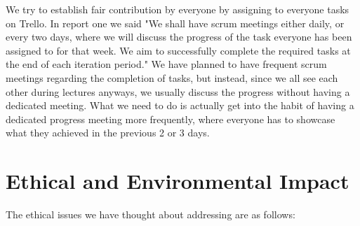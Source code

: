 \documentclass[a4paper,12pt]{article}
\begin{document}

	We try to establish fair contribution by everyone by assigning to everyone tasks on Trello. In report one we said "We shall have scrum meetings either daily, or every two days, where we will discuss the progress of the task everyone has been assigned to for that week. We aim to successfully complete the required tasks at the end of each iteration period." We have planned to have frequent scrum meetings regarding the completion of tasks, but instead, since we all see each other during lectures anyways, we usually discuss the progress without having a dedicated meeting. What we need to do is actually get into the habit of having a dedicated progress meeting more frequently, where everyone has to showcase what they achieved in the previous 2 or 3 days.
	
	\section{Ethical and Environmental Impact}	
	
	The ethical issues we have thought about addressing are as follows:
	
\end{document}
